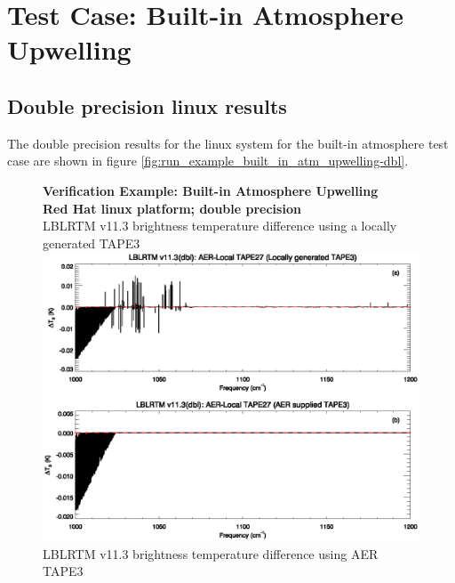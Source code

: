 \section{Test Case: Built-in Atmosphere Upwelling}

\subsection{Double precision linux results}
The double precision results for the linux system for the built-in atmosphere test case are shown in figure \ref{fig:run_example_built_in_atm_upwelling-dbl}.

\begin{figure}[htp]
  \centering
  \qquad\sffamily\textbf{Verification Example: Built-in Atmosphere Upwelling}\\
  \qquad\sffamily\textbf{Red Hat linux platform; double precision}\\
  \qquad\textsf{LBLRTM v11.3 brightness temperature difference using a locally generated TAPE3}\\
  \includegraphics[bb=85 403 534 558,clip,scale=1.0]{graphics/run_example_built_in_atm_upwelling/dbl.eps}
  \qquad\textsf{LBLRTM v11.3 brightness temperature difference using AER TAPE3}\\

\end{figure}
